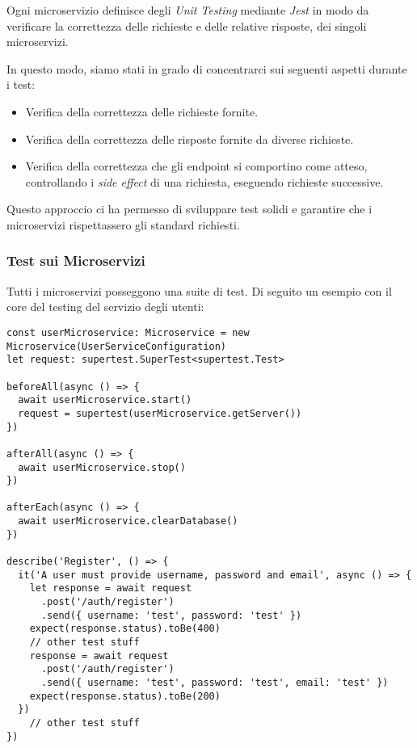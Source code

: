 Ogni microservizio definisce degli \emph{Unit Testing} mediante \emph{Jest} in modo da verificare la correttezza delle richieste e delle relative risposte, dei singoli microservizi.

In questo modo, siamo stati in grado di concentrarci sui seguenti aspetti durante i test:

\begin{itemize}
    \item Verifica della correttezza delle richieste fornite.

    \item Verifica della correttezza delle risposte fornite da diverse richieste.

    \item Verifica della correttezza che gli endpoint si comportino come atteso, controllando i \emph{side effect} di una richiesta, eseguendo richieste successive.
\end{itemize}

Questo approccio ci ha permesso di sviluppare test solidi e garantire che i microservizi rispettassero gli standard richiesti.

%
%
%
\subsubsection{Test sui Microservizi}

Tutti i microservizi posseggono una suite di test.
%
Di seguito un esempio con il core del testing del servizio degli utenti:

\begin{lstlisting}[style=typescript, caption={microservice Test}, label=lst:login:route:test]
const userMicroservice: Microservice = new Microservice(UserServiceConfiguration)
let request: supertest.SuperTest<supertest.Test>

beforeAll(async () => {
  await userMicroservice.start()
  request = supertest(userMicroservice.getServer())
})

afterAll(async () => {
  await userMicroservice.stop()
})

afterEach(async () => {
  await userMicroservice.clearDatabase()
})

describe('Register', () => {
  it('A user must provide username, password and email', async () => {
    let response = await request
      .post('/auth/register')
      .send({ username: 'test', password: 'test' })
    expect(response.status).toBe(400)
    // other test stuff
    response = await request
      .post('/auth/register')
      .send({ username: 'test', password: 'test', email: 'test' })
    expect(response.status).toBe(200)
  })
    // other test stuff
})
\end{lstlisting}

